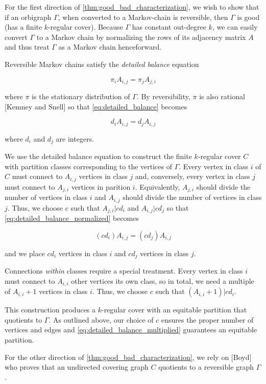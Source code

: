 For the first direction of \ref{thm:good_bad_characterization}, we wish to show that if an orbigraph $\Gamma$, when converted to a Markov-chain is reversible, then $\Gamma$ is good (has a finite $k$-regular cover). Because $\Gamma$ has constant out-degree $k$, we can easily convert $\Gamma$ to a Markov chain by normalizing the rows of its adjacency matrix $A$ and thus treat $\Gamma$ as a Markov chain henceforward.

Reversible Markov chains satisfy the \textit{detailed balance} equation 

\begin{equation}\label{eq:detailed_balance}
	\pi_i A_{ i, j } = \pi_j A_{ j, i }
\end{equation}

where $\pi$ is the stationary distribution of $\Gamma$. By reversibility, $\pi$ is also rational [Kemney and Snell] so that \ref{eq:detailed_balance} becomes

\begin{equation} \label{eq:detailed_balance_normalized}
	d_i A_{i, j} = d_j A_{ i, j }
\end{equation}

where $d_i$ and $d_j$ are integers.

We use the detailed balance equation to construct the finite $k$-regular cover $C$ with partition classes corresponding to the vertices of $\Gamma$. Every vertex in class $i$ of $C$ must connect to $A_{i, j}$ vertices in class $j$ and, conversely, every vertex in class $j$ must connect to $A_{j, i}$ vertices in parition $i$.  Equivalently, $A_{j, i}$ should divide the number of vertices in class $i$ and $A_{i, j}$ should divide the number of vertices in class $j$. Thus, we choose $c$ such that $A_{j, i} | c d_i$ and $A_{i, j} | c d_j$ so that \ref{eq:detailed_balance_normalized} becomes

\begin{equation} \label{eq:detailed_balance_multiplied}
	(c d_i) A_{ i, j } = (c d_j) A_{ i, j }
\end{equation}

and we place $c d_i$ vertices in class $i$ and $c d_j$ vertices in class $j$.

Connections \textit{within} classes require a special treatment. Every vertex in class $i$ must connect to $A_{i, i}$ other vertices its own class, so in total, we need a multiple of $A_{i, i} + 1$ vertices in class $i$. Thus, we choose $c$ such that $(A_{ i, i } + 1) | c d_i$. 

This construction produces a $k$-regular cover with an equitable partition that quotients to $\Gamma$. As outlined above, our choice of $c$ ensures the proper number of vertices and edges and \ref{eq:detailed_balance_multiplied} guarantees an equitable partition.

For the other direction of \ref{thm:good_bad_characterization}, we rely on [Boyd] who proves that an undirected covering graph $C$ quotients to a reversible graph $\Gamma$. 
